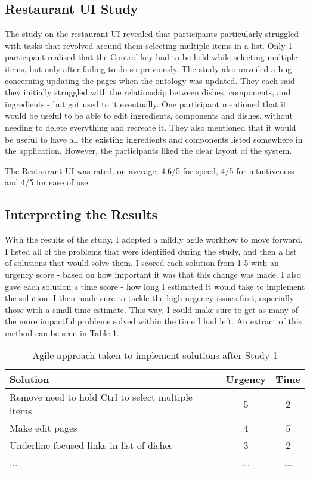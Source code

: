 \subsection{Restaurant UI Study}

The study on the restaurant UI revealed that participants particularly struggled with tasks that revolved around them selecting multiple items in a list. Only 1 participant realised that the Control key had to be held while selecting multiple items, but only after failing to do so previously. The study also unveiled a bug concerning updating the pages when the ontology was updated. They each said they initially struggled with the relationship between dishes, components, and ingredients - but got used to it eventually. One participant mentioned that it would be useful to be able to edit ingredients, components and dishes, without needing to delete everything and recreate it. They also mentioned that it would be useful to have all the existing ingredients and components listed somewhere in the application. However, the participants liked the clear layout of the system. 

The Restaurant UI was rated, on average, 4.6/5 for speed, 4/5 for intuitiveness and 4/5 for ease of use.

\subsection{Interpreting the Results}

With the results of the study, I adopted a mildly agile workflow to move forward. I listed all of the problems that were identified during the study, and then a list of solutions that would solve them. I scored each solution from 1-5 with an urgency score - based on how important it was that this change was made. I also gave each solution a time score - how long I estimated it would take to implement the solution. I then made sure to tackle the high-urgency issues first, especially those with a small time estimate. This way, I could make sure to get as many of the more impactful problems solved within the time I had left. An extract of this method can be seen in Table \ref{tab:agile}.

\begin{table}[h]
\centering
\begin{tabular}{ |l|c|c| }
\hline
\textbf{Solution} & \textbf{Urgency} & \textbf{Time}\\
\hline
Remove need to hold Ctrl to select multiple items & 5 & 2 \\
\hline
Make edit pages & 4 & 5 \\
\hline
Underline focused links in list of dishes & 3 & 2 \\
\hline
... &  ... & ... \\
\hline
\end{tabular}
\caption{Agile approach taken to implement solutions after Study 1}
\label{tab:agile}
\end{table}


